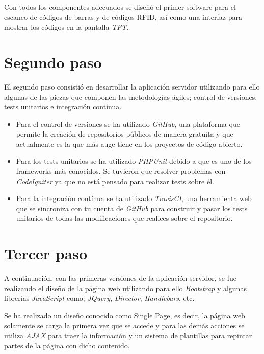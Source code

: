 Con todos los componentes adecuados se diseñó el primer software para el escaneo de códigos de barras y de códigos RFID, así como una interfaz para mostrar los códigos en la pantalla \emph{TFT}.

\section{Segundo paso}

El segundo paso consistió en desarrollar la aplicación servidor utilizando para ello algunas de las piezas que componen las metodologías ágiles; control de versiones, tests unitarios e integración contínua.

\begin{itemize}

    \item Para el control de versiones se ha utilizado \emph{GitHub}, una plataforma que permite la creación de repositorios públicos de manera gratuita y que actualmente es la que más auge tiene en los proyectos de código abierto.

    \item Para los tests unitarios se ha utilizado \emph{PHPUnit} debido a que es uno de los frameworks más conocidos. Se tuvieron que resolver problemas con \emph{CodeIgniter} ya que no está pensado para realizar tests sobre él.

    \item Para la integración contínua se ha utilizado \emph{TravisCI}, una herramienta web que se sincroniza con tu cuenta de \emph{GitHub} para construir y pasar los tests unitarios de todas las modificaciones que realices sobre el repositorio.

\end{itemize}

\section{Tercer paso}

A continuación, con las primeras versiones de la aplicación servidor, se fue realizando el diseño de la página web utilizando para ello \emph{Bootstrap} y algunas librerías \emph{JavaScript} como; \emph{JQuery}, \emph{Director}, \emph{Handlebars}, etc.

Se ha realizado un diseño conocido como Single Page, es decir, la página web solamente se carga la primera vez que se accede y para las demás acciones se utiliza \emph{AJAX} para traer la información y un sistema de plantillas para repintar partes de la página con dicho contenido.

